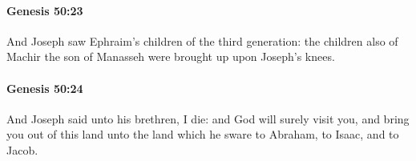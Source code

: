 		\paragraph{Genesis 50:23} %
			\label{GENESIS-50-23}

			And Joseph saw Ephraim’s children of the third generation: the children also of Machir the son of Manasseh were brought up upon Joseph’s knees.


		\paragraph{Genesis 50:24} %
			\label{GENESIS-50-24}

			And Joseph said unto his brethren, I die: and God will surely visit you, and bring you out of this land unto the land which he sware to Abraham, to Isaac, and to Jacob.

